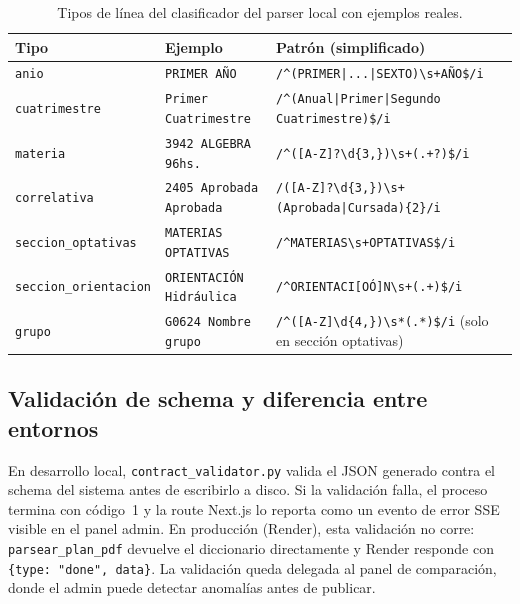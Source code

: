 \documentclass[12pt, a4paper]{report}
\begin{document}
\begin{table}[htbp]
\centering
\small
\begin{tabular}{p{3.5cm} p{4.5cm} p{5cm}}
\toprule
\textbf{Tipo} & \textbf{Ejemplo} & \textbf{Patrón (simplificado)} \\
\midrule
\texttt{anio}
  & \texttt{PRIMER AÑO}
  & \texttt{/\^{}(PRIMER|...|SEXTO)\textbackslash{}s+AÑO\$/i} \\
\addlinespace
\texttt{cuatrimestre}
  & \texttt{Primer Cuatrimestre}
  & \texttt{/\^{}(Anual|Primer|Segundo Cuatrimestre)\$/i} \\
\addlinespace
\texttt{materia}
  & \texttt{3942 ALGEBRA 96hs.}
  & \texttt{/\^{}([A-Z]?\textbackslash{}d\{3,\})\textbackslash{}s+(.+?)\$/i} \\
\addlinespace
\texttt{correlativa}
  & \texttt{2405 Aprobada Aprobada}
  & \texttt{/([A-Z]?\textbackslash{}d\{3,\})\textbackslash{}s+(Aprobada|Cursada)\{2\}/i} \\
\addlinespace
\texttt{seccion\_optativas}
  & \texttt{MATERIAS OPTATIVAS}
  & \texttt{/\^{}MATERIAS\textbackslash{}s+OPTATIVAS\$/i} \\
\addlinespace
\texttt{seccion\_orientacion}
  & \texttt{ORIENTACIÓN Hidráulica}
  & \texttt{/\^{}ORIENTACI[OÓ]N\textbackslash{}s+(.+)\$/i} \\
\addlinespace
\texttt{grupo}
  & \texttt{G0624 Nombre grupo}
  & \texttt{/\^{}([A-Z]\textbackslash{}d\{4,\})\textbackslash{}s*(.*)\$/i}
    (solo en sección optativas) \\
\bottomrule
\end{tabular}
\caption{Tipos de línea del clasificador del parser local con ejemplos reales.}
\label{tab:patrones}
\end{table}

\subsection{Validación de schema y diferencia entre entornos}

En desarrollo local, \texttt{contract\_validator.py} valida el JSON generado
contra el schema del sistema antes de escribirlo a disco. Si la validación falla,
el proceso termina con código~1 y la route Next.js lo reporta como un evento de
error SSE visible en el panel admin. En producción (Render), esta validación no
corre: \texttt{parsear\_plan\_pdf} devuelve el diccionario directamente y Render
responde con \texttt{\{type: "done", data\}}. La validación queda delegada al
panel de comparación, donde el admin puede detectar anomalías antes de publicar.
\end{document}
